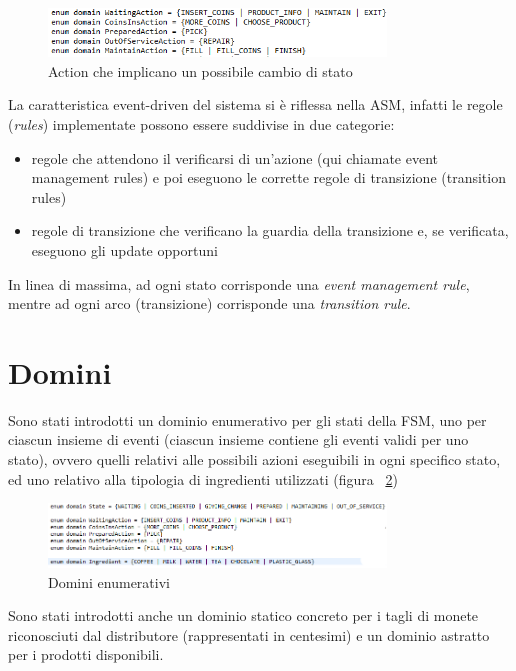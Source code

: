 \begin{figure}[h]
	\centering
	\includegraphics[width=0.8\textwidth]{Immagini/ActionASM.png}
	\caption{Action che implicano un possibile cambio di stato}
	\label{fig:actionASM}
\end{figure}

La caratteristica event-driven del sistema si è riflessa nella ASM, infatti le regole (\textit{rules}) implementate possono essere suddivise in due categorie:
\begin{itemize}
	\item  regole che attendono il verificarsi di un’azione (qui chiamate event management rules) e poi eseguono le corrette regole di transizione (transition rules)
	\item regole di transizione che verificano la guardia della transizione e, se verificata, eseguono gli update opportuni
\end{itemize}
	
In linea di massima, ad ogni stato corrisponde una \textit{event management rule}, mentre ad ogni arco (transizione) corrisponde una \textit{transition rule}.

\section{Domini}
Sono stati introdotti un dominio enumerativo per gli stati della FSM, uno per ciascun insieme di eventi (ciascun insieme contiene gli eventi validi per uno stato), ovvero quelli relativi alle possibili azioni eseguibili in ogni specifico stato, ed uno relativo alla tipologia di ingredienti utilizzati (figura ~\ref{fig:enumDomain})

\begin{figure}[h]
	\centering
	\includegraphics[width=0.8\textwidth]{Immagini/EnumDomain.png}
	\caption{Domini enumerativi}
	\label{fig:enumDomain}
\end{figure}

Sono stati introdotti anche un dominio statico concreto per i tagli di monete riconosciuti dal distributore (rappresentati in centesimi) e un dominio astratto per i prodotti disponibili.


